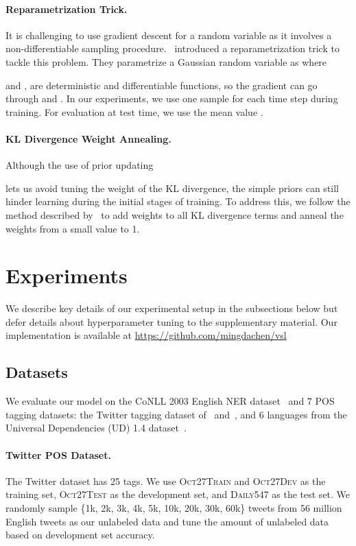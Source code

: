 \documentclass[11pt,a4paper]{article}
\newcommand{\qtcomments}[1]{\textcolor{gray}{\bf \small [ #1 --QT]}}
\renewcommand{\qtcomments}[1]{}
\begin{document}
\paragraph{Reparametrization Trick.}
It is challenging to use gradient descent for a random variable as it involves a non-differentiable sampling procedure.~\citet{kingma2013auto} introduced a reparametrization trick to tackle this problem.
They parametrize a Gaussian random variable  as  where

\qtcomments{ seems more precise.} and ,  are deterministic and differentiable functions,
so the gradient can go through
 and .
In our experiments, we use one sample for each time step during training.  For evaluation at test time, we use the mean value .

\paragraph{KL Divergence Weight Annealing.} Although the use of prior updating

lets us avoid tuning the weight of the KL divergence, the simple priors can still hinder learning during the initial stages of training. To address this, we follow the method described by~\citet{bowman2016generating} to add weights to all KL divergence terms and anneal the weights from a small value to 1.

\section{Experiments}

We describe key details of our experimental setup in the subsections below but defer details about hyperparameter tuning to the supplementary material. Our implementation is available at \url{https://github.com/mingdachen/vsl}

\subsection{Datasets}
We evaluate our model on the CoNLL 2003 English NER dataset~\cite{tjong2003introduction} and 7 POS tagging datasets: the Twitter tagging dataset of~\citet{gimpel-11a} and~\citet{owoputi-13}, and 6 languages from the Universal Dependencies (UD) 1.4 dataset~\cite{mcdonald2013universal}.

\paragraph{Twitter POS Dataset.} The Twitter dataset has 25 tags. We use \textsc{Oct27Train} and \textsc{Oct27Dev} as the training set, \textsc{Oct27Test} as the development set, and \textsc{Daily547} as the test set. We randomly sample \{1k, 2k, 3k, 4k, 5k, 10k, 20k, 30k, 60k\} tweets from 56 million English tweets as our unlabeled data and tune the amount of unlabeled data based on development set accuracy.
\end{document}
